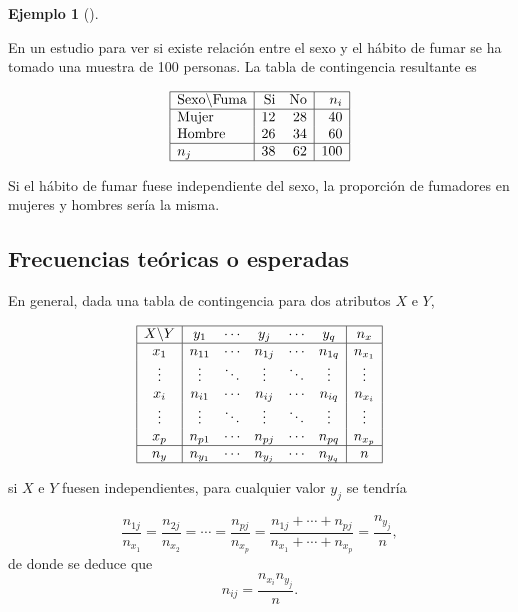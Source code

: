 \documentclass[
  spanish,
  a4paper,
]{scrreport}
\theoremstyle{plain}
\theoremstyle{definition}
\newtheorem{example}{Ejemplo}[chapter]
\theoremstyle{definition}
\theoremstyle{remark}
\begin{document}
\begin{example}[]\protect\hypertarget{exm-tabla-contingencia}{}\label{exm-tabla-contingencia}

En un estudio para ver si existe relación entre el sexo y el hábito de
fumar se ha tomado una muestra de 100 personas. La tabla de contingencia
resultante es

\[
\begin{array}{|l|rr|r|}
\hline
\mbox{Sexo}\backslash\mbox{Fuma} & \mbox{Si} & \mbox{No} & n_i\\
\hline
\mbox{Mujer} & 12 & 28 & 40 \\
\mbox{Hombre} & 26 & 34 & 60 \\
\hline
n_j & 38 & 62 & 100\\
\hline
\end{array}
\]

Si el hábito de fumar fuese independiente del sexo, la proporción de
fumadores en mujeres y hombres sería la misma.

\end{example}

\subsection{Frecuencias teóricas o
esperadas}\label{frecuencias-teuxf3ricas-o-esperadas}

En general, dada una tabla de contingencia para dos atributos \(X\) e
\(Y\),

\[
\begin{array}{|c|ccccc|c|}
\hline
X\backslash Y & y_1 & \cdots & y_j & \cdots & y_q & n_x\\
\hline
x_1 & n_{11} & \cdots & n_{1j} & \cdots & n_{1q} & n_{x_1}\\
\vdots & \vdots & \ddots & \vdots & \ddots & \vdots & \vdots \\
x_i & n_{i1} & \cdots & n_{ij} & \cdots & n_{iq} & n_{x_i}\\
\vdots & \vdots & \ddots & \vdots & \ddots & \vdots & \vdots\\
x_p & n_{p1} & \cdots & n_{pj} & \cdots & n_{pq} & n_{x_p} \\
\hline
n_y & n_{y_1} & \cdots & n_{y_j} & \cdots & n_{y_q} & n\\
\hline
\end{array}
\]

si \(X\) e \(Y\) fuesen independientes, para cualquier valor \(y_j\) se
tendría

\[
\frac{n_{1j}}{n_{x_1}} = \frac{n_{2j}}{n_{x_2}} = \cdots = \frac{n_{pj}}{n_{x_p}} = \frac{n_{1j}+\cdots
+n_{pj}}{n_{x_1}+\cdots+n_{x_p}} = \frac{n_{y_j}}{n},\] de donde se
deduce que \[n_{ij} = \frac{n_{x_i}n_{y_j}}{n}.
\]
\end{document}
